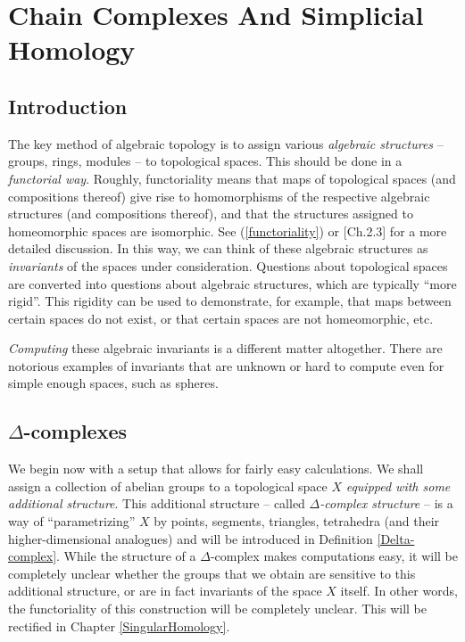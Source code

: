 \documentclass[11pt,a4paper]{report}
\begin{document}
\setcounter{tocdepth}{1}
\tableofcontents

     
      \chapter{Chain Complexes And Simplicial Homology}
      \label{chapter1}

      \section{Introduction} 
      
	      
	      The key method of  algebraic topology is to assign various \emph{algebraic structures} -- groups, rings, modules --  to topological spaces.
	      This should be done in a
	      \emph{ functorial way}. 
	      Roughly, functoriality means that maps of topological spaces (and compositions thereof) give rise to 
	      homomorphisms of the respective algebraic structures
	      (and compositions thereof), and that the structures assigned to homeomorphic spaces are isomorphic. 
	      See (\ref{functoriality}) or \cite{hatcher}[Ch.2.3] for a more detailed discussion.
	      In this way,
	      we can think of these algebraic structures as \emph{invariants} of the spaces under consideration.
	      Questions about topological
	      spaces  are converted into questions about algebraic structures, which  are typically ``more rigid''. This rigidity can
	      be used to demonstrate, for example,  that maps between certain spaces do not exist, or that certain spaces are not homeomorphic, etc. 
	      
	      \emph{Computing} these algebraic invariants is a different matter altogether. There are notorious examples of invariants that are unknown or
	      hard to compute even for simple enough spaces, such as spheres.
	      
	      \section{$\Delta$-complexes}
	      
	      We begin now with a setup that allows for fairly easy calculations. We shall
	      assign a collection of abelian groups to a topological space $X$ \emph{equipped with some additional structure}.
	      This additional structure -- called \emph{$\Delta$-complex structure} -- is a way of ``parametrizing'' $X$ by points, 
	      segments, triangles, tetrahedra (and their higher-dimensional analogues) and will be introduced in Definition \ref{Delta-complex}.
	      While the structure of a $\Delta$-complex makes computations easy, it will be completely unclear whether the groups that we obtain are sensitive
	      to this additional structure, or are in fact invariants  of the space $X$ itself. In other words, the functoriality of this construction will be completely unclear.
	      This will be rectified in Chapter \ref{SingularHomology}.
	      
\end{document}
